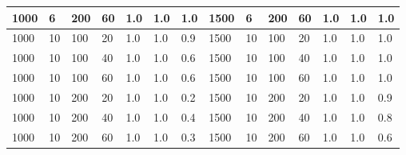 \begin{table}[H]
\begin{tabular}{|l|l|l|l|l|l|l|l|l|l|l|l|l|l|}
1000                    & 6                      & 200                    & 60                      & 1.0                       & 1.0                    & 1.0                     & 1500                   & 6                      & 200                    & 60                      & 1.0                       & 1.0                    & 1.0                     \\ \hline
1000                    & 10                     & 100                    & 20                      & 1.0                       & 1.0                    & 0.9                     & 1500                   & 10                     & 100                    & 20                      & 1.0                       & 1.0                    & 1.0                     \\ \hline
1000                    & 10                     & 100                    & 40                      & 1.0                       & 1.0                    & 0.6                     & 1500                   & 10                     & 100                    & 40                      & 1.0                       & 1.0                    & 1.0                     \\ \hline
1000                    & 10                     & 100                    & 60                      & 1.0                       & 1.0                    & 0.6                     & 1500                   & 10                     & 100                    & 60                      & 1.0                       & 1.0                    & 1.0                     \\ \hline
1000                    & 10                     & 200                    & 20                      & 1.0                       & 1.0                    & 0.2                     & 1500                   & 10                     & 200                    & 20                      & 1.0                       & 1.0                    & 0.9                     \\ \hline
1000                    & 10                     & 200                    & 40                      & 1.0                       & 1.0                    & 0.4                     & 1500                   & 10                     & 200                    & 40                      & 1.0                       & 1.0                    & 0.8                     \\ \hline
1000                    & 10                     & 200                    & 60                      & 1.0                       & 1.0                    & 0.3                     & 1500                   & 10                     & 200                    & 60                      & 1.0                       & 1.0                    & 0.6                     \\ \hline

\end{tabular}
\end{table}
